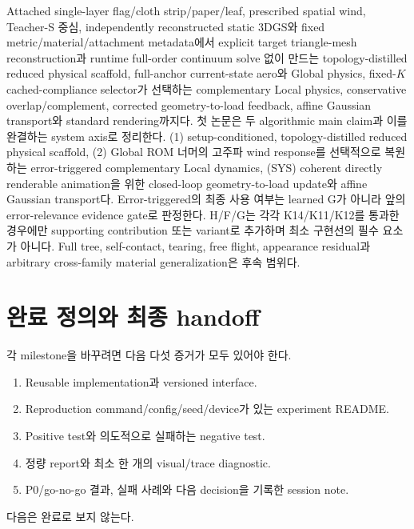 \documentclass[10pt,a4paper]{article}
\newcommand{\done}{\textcolor{DoneGreen}{\(\boxtimes\)}}
\begin{document}
\begin{tcolorbox}[colback=LightGreen,colframe=DoneGreen,title=첫 논문 최소 구현선,fonttitle=\bfseries]
Attached single-layer flag/cloth strip/paper/leaf, prescribed spatial wind, Teacher-S 중심,
independently reconstructed static 3DGS와 fixed metric/material/attachment metadata에서
explicit target triangle-mesh reconstruction과 runtime full-order continuum solve 없이 만드는 topology-distilled reduced physical scaffold,
full-anchor current-state aero와 Global physics, fixed-\(K\) cached-compliance selector가 선택하는 complementary Local physics,
conservative overlap/complement, corrected geometry-to-load feedback,
affine Gaussian transport와 standard rendering까지다.
첫 논문은 두 algorithmic main claim과 이를 완결하는 system axis로 정리한다.
(1) setup-conditioned, topology-distilled reduced physical scaffold,
(2) Global ROM 너머의 고주파 wind response를 선택적으로 복원하는 error-triggered complementary Local dynamics,
(SYS) coherent directly renderable animation을 위한 closed-loop geometry-to-load update와 affine Gaussian transport다.
Error-triggered의 최종 사용 여부는 learned G가 아니라 앞의 error-relevance evidence gate로 판정한다.
H/F/G는 각각 K14/K11/K12를 통과한 경우에만 supporting contribution 또는 variant로 추가하며 최소 구현선의 필수 요소가 아니다.
Full tree, self-contact, tearing, free flight, appearance residual과 arbitrary cross-family material generalization은 후속 범위다.
\end{tcolorbox}

\section{완료 정의와 최종 handoff}

각 milestone을  바꾸려면 다음 다섯 증거가 모두 있어야 한다.

\begin{enumerate}
  \item Reusable implementation과 versioned interface.
  \item Reproduction command/config/seed/device가 있는 experiment README.
  \item Positive test와 의도적으로 실패하는 negative test.
  \item 정량 report와 최소 한 개의 visual/trace diagnostic.
  \item P0/go-no-go 결과, 실패 사례와 다음 decision을 기록한 session note.
\end{enumerate}

다음은 완료로 보지 않는다.
\end{document}

